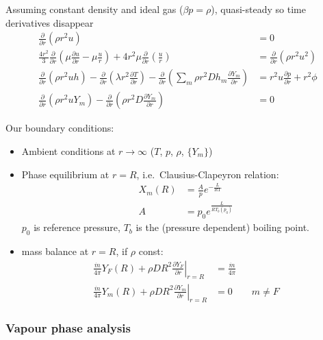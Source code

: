 \documentclass[12pt]{report}
\begin{document}
Assuming constant density and ideal gas ($\beta p = \rho$), quasi-steady so time derivatives disappear
\begin{align}
  \frac{\partial}{\partial r} ( \rho r^2 u ) &= 0 \\
  \frac{4 r^2}{3} \frac{\partial}{\partial r}
  \left( \mu \frac{\partial u}{\partial r} - \mu \frac{u}{r} \right)
  + 4 r^2 \mu \frac{\partial}{\partial r} \left( \frac{u}{r} \right)
  &= \frac{\partial}{\partial r} ( \rho r^2 u^2 ) \\
  \frac{\partial}{\partial r} ( \rho r^2 u h ) -
  \frac{\partial}{\partial r} ( \lambda r^2 \frac{\partial T}{\partial r} ) -
  \frac{\partial}{\partial r} ( \sum_m \rho r^2 D h_m \frac{\partial Y_m}{\partial r} ) &=
  r^2 u \frac{\partial p}{\partial r} + r^2 \phi \\
  \frac{\partial}{\partial r} ( \rho r^2 u Y_m ) -
  \frac{\partial}{\partial r} ( \rho r^2 D \frac{\partial Y_m}{\partial r} ) &= 0
\end{align}

Our boundary conditions:
\begin{itemize}
\item Ambient conditions at $r \to \infty$ ($T$, $p$, $\rho$, $\{ Y_m \}$)
\item Phase equilibrium at $r = R$, i.e.\ Clausius-Clapeyron relation:
  \begin{align}
    X_m(R) &= \frac{A}{p} e^{-\frac{L}{RT}} \\
    A &= p_0 e^{\frac{L}{RT_b(p_0)}}
  \end{align}
  $p_0$ is reference pressure, $T_b$ is the (pressure dependent) boiling point.
\item mass balance at $r = R$, if $\rho$ const:
  \begin{align}
    \frac{\dot{m}}{4\pi} Y_F(R) + \rho D R^2 \left. \frac{\partial Y_F}{\partial r} \right|_{r=R} &= \frac{\dot{m}}{4\pi} \\
    \frac{\dot{m}}{4\pi} Y_m(R) + \rho D R^2 \left. \frac{\partial Y_m}{\partial r} \right|_{r=R} &= 0 \qquad m \ne F
  \end{align}
\end{itemize}

\subsubsection{Vapour phase analysis}
\end{document}
